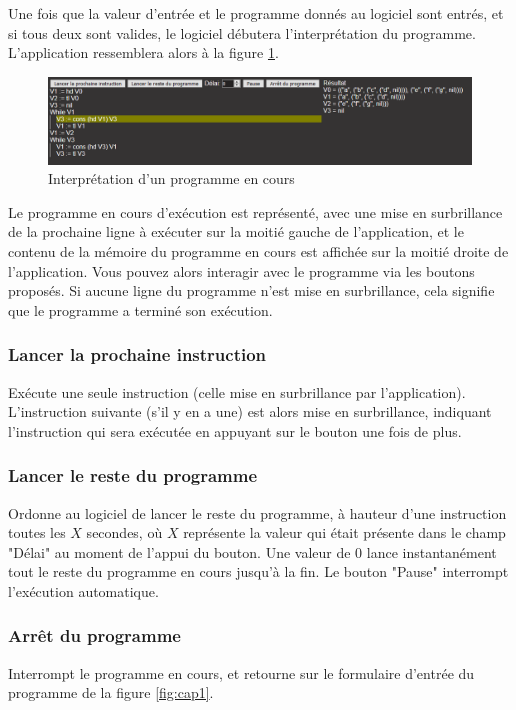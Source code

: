 \documentclass{article}
\begin{document}
Une fois que la valeur d'entrée et le programme donnés au logiciel sont entrés, et si tous deux sont valides, le logiciel débutera l'interprétation du programme. L'application ressemblera alors à la figure \ref{fig:cap3}.

\begin{figure}[h]
\includegraphics[width=\textwidth]{img/Capture3.PNG}
\caption{Interprétation d'un programme en cours}
\label{fig:cap3}
\end{figure}

Le programme en cours d'exécution est représenté, avec une mise en surbrillance de la prochaine ligne à exécuter sur la moitié gauche de l'application, et le contenu de la mémoire du programme en cours est affichée sur la moitié droite de l'application. Vous pouvez alors interagir avec le programme via les boutons proposés. Si aucune ligne du programme n'est mise en surbrillance, cela signifie que le programme a terminé son exécution.

\subsubsection{Lancer la prochaine instruction}
Exécute une seule instruction (celle mise en surbrillance par l'application). L'instruction suivante (s'il y en a une) est alors mise en surbrillance, indiquant l'instruction qui sera exécutée en appuyant sur le bouton une fois de plus.

\subsubsection{Lancer le reste du programme}
Ordonne au logiciel de lancer le reste du programme, à hauteur d'une instruction toutes les $X$ secondes, où $X$ représente la valeur qui était présente dans le champ "Délai" au moment de l'appui du bouton. Une valeur de 0 lance instantanément tout le reste du programme en cours jusqu'à la fin. Le bouton "Pause" interrompt l'exécution automatique.

\subsubsection{Arrêt du programme}
Interrompt le programme en cours, et retourne sur le formulaire d'entrée du programme de la figure \ref{fig:cap1}.
\end{document}
